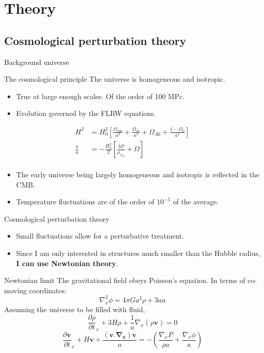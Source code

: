 \documentclass{beamer}
\begin{document}
\section{Theory}
\subsection{Cosmological perturbation theory}
\begin{frame}{Background universe}
	\begin{block}{The cosmological principle}
		The universe is homogeneous and isotropic.
	\end{block}
	\begin{itemize}
		\item True at large enough scales: Of the order of 100 MPc.
		\item Evolution governed by the FLRW equations.
	\end{itemize}
	\begin{equation}
	\begin{aligned}
	H^2&=H_0^2\left[\frac{\Omega_{m0}}{a^3}+
	\frac{{\Omega}_{r0}}{a^4}+
	{\Omega}_{\Lambda 0}+
	\frac{1-\Omega_0}{a^2}\right]\\
	\frac{\ddot{a}}{a}&=-\frac{H_0^2}{2}[\frac{3P}{\rho_{cr_0}}+\Omega]\\
	\end{aligned}
	\end{equation}
	\begin{itemize}
		\item The early universe being largely homogeneous and isotropic is reflected in the CMB.
		\item Temperature fluctuations are of the order of $10^{-5}$ of the average.
	\end{itemize}
\end{frame}
\begin{frame}{Cosmological perturbation theory}
	\begin{itemize}
		\item Small fluctuations allow for a perturbative treatment.
		\item Since I am only interested in structures much smaller than the Hubble radius, \textbf{I can use Newtonian theory}.
	\end{itemize}
	\begin{block}{Newtonian limit}
		The gravitational field obeys Poisson's equation. In terms of co-moving coordinates:
		\begin{equation}
		\nabla_x^2\phi=4\pi Ga^2\rho+3a\ddot{a}
		\end{equation}
		Assuming the universe to be filled with fluid,
		\begin{equation}
		\tag{continuity eqn.}
		\frac{\partial\rho}{\partial t}_x +3H\rho+\frac{1}{a}\nabla_x(\rho\mathbf{v})=0
		\end{equation}
		\begin{equation}
		\tag{Euler eqn.}
		\frac{\partial \mathbf{v}}{\partial t}_x +H\mathbf{v}+\frac{\mathbf{(v.\nabla_x)}\mathbf{v}}{a}=-\left(\frac{\nabla_xP}{\rho a}+\frac{\nabla_x\phi}{a}\right)
		\end{equation}
	\end{block}
\end{frame}
\end{document}
